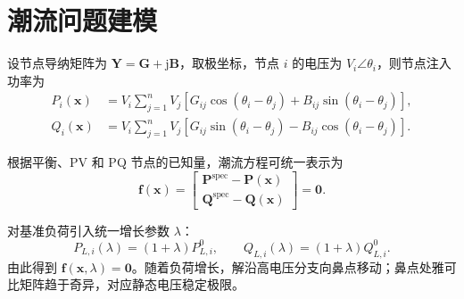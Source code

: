 \section{潮流问题建模}
\label{sec:model}

设节点导纳矩阵为 $\bm{Y}=\bm{G}+\mathrm{j}\bm{B}$，取极坐标，节点 $i$ 的电压为 $V_i\angle\theta_i$，则节点注入功率为
\begin{align}
P_i(\bm{x})&=V_i\sum_{j=1}^{n}V_j
\left[G_{ij}\cos(\theta_i-\theta_j)+B_{ij}\sin(\theta_i-\theta_j)\right],\\
Q_i(\bm{x})&=V_i\sum_{j=1}^{n}V_j
\left[G_{ij}\sin(\theta_i-\theta_j)-B_{ij}\cos(\theta_i-\theta_j)\right].
\end{align}

根据平衡、PV 和 PQ 节点的已知量，潮流方程可统一表示为
\begin{equation}
\bm{f}(\bm{x})=
\begin{bmatrix}
\bm{P}^{\mathrm{spec}}-\bm{P}(\bm{x})\\
\bm{Q}^{\mathrm{spec}}-\bm{Q}(\bm{x})
\end{bmatrix}=\bm{0}.
\label{eq:power-flow}
\end{equation}

对基准负荷引入统一增长参数 $\lambda$：
\begin{equation}
P_{L,i}(\lambda)=(1+\lambda)P_{L,i}^{0},\qquad
Q_{L,i}(\lambda)=(1+\lambda)Q_{L,i}^{0}.
\end{equation}
由此得到 $\bm{f}(\bm{x},\lambda)=\bm{0}$。随着负荷增长，解沿高电压分支向鼻点移动；鼻点处雅可比矩阵趋于奇异，对应静态电压稳定极限。


